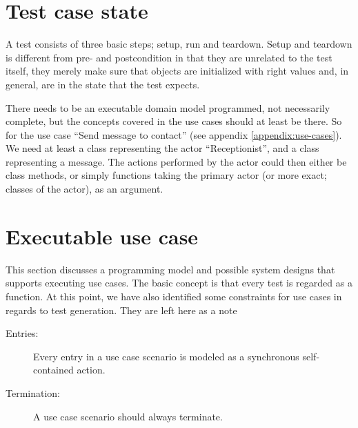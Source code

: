 \section{Test case state}
\label{sec:test_case_state}

A test consists of three basic steps; setup, run and teardown. Setup and teardown is different from pre- and postcondition in that they are unrelated to the test itself, they merely make sure that objects are initialized with right values and, in general, are in the state that the test expects.

There needs to be an executable domain model programmed, not necessarily complete, but the concepts covered in the use cases should at least be there. So for the use case ``Send message to contact'' (see appendix \ref{appendix:use-cases}). We need at least a class representing the actor ``Receptionist'', and a class representing a message. The actions performed by the actor could then either be class methods, or simply functions taking the primary actor (or more exact; classes of the actor), as an argument.

\section{Executable use case}
This section discusses a programming model and possible system designs that supports executing use cases. The basic concept is that every test is regarded as a function.
At this point, we have also identified some constraints for use cases in regards to test generation. They are left here as a note
\begin{description}
  \item[Entries:] Every entry in a use case scenario is modeled as a synchronous self-contained action.
  \item[Termination:] A use case scenario should always terminate.
\end{description}
